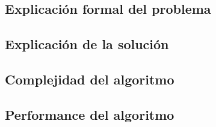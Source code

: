 \subsection{Explicación formal del problema}

\subsection{Explicación de la solución}

\subsection{Complejidad del algoritmo}

\subsection{Performance del algoritmo}